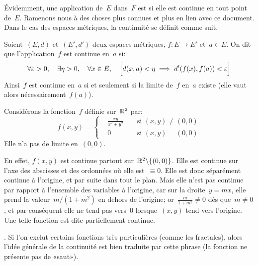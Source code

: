\medskip
Évidemment, une application de~$E$ dans~$F$ est  si elle est continue en tout point de~$E$.
\medskipvm
Ramenons nous à des choses plus connues et plus en lien avec ce document.
Dans le cas des espaces métriques, la continuité se définit comme suit.

\begin{definition}
Soient~$(E,d)$ et~$(E',d')$ deux espaces métriques, $f: E \to E'$ et~$a \in E$.
On dit que l'application~$f$ est continue en~$a$ si:
\begin{equation}
  \forall \varepsilon > 0, \quad \exists \eta > 0, \quad \forall x \in E, \quad \Bigl[d(x,a)<\eta \implies d'(f(x),f(a))<\varepsilon\Bigr]
\end{equation}
Ainsi~$f$ est continue en~$a$ si et seulement si la limite de~$f$ en~$a$ existe (elle vaut alors nécessairement~$f(a)$).
\end{definition}

\medskip
Considérons la fonction~$f$ définie sur~$\mathbb R^2$ par:
\begin{equation}
  f(x,y)=\left\{\begin{aligned}&\frac{xy}{x^2+y^2}&&\text{ si } (x,y)\neq(0,0) \\
&0&&\text{ si } (x,y)=(0,0) \end{aligned}\right.
\end{equation}
Elle n'a pas de limite en~$(0,0)$.

\small
En effet, $f(x,y)$ est continue partout sur~$\mathbb R^2\backslash\{(0,0)\}$. Elle est continue sur l'axe des abscisses et des ordonnées où elle est~$\equiv0$. Elle est donc séparément continue à l'origine, et par suite dans tout le plan. Mais elle n'est pas continue par rapport à l'ensemble des variables à l'origine, car sur la droite~$y=mx$, elle prend la valeur~$m/(1+m^2)$ en dehors de l'origine; or~$\frac{m}{1+m^2}\ne0$ dès que~$m\ne0$, et par conséquent elle ne tend pas vers~$0$ lorsque~$(x,y)$ tend vers l'origine. Une telle fonction est dite partiellement continue.
\normalsize

\medskip
{}. Si l'on exclut certains fonctions très particulières (comme les fractales), alors l'idée générale de la continuité est bien traduite par cette phrase (la fonction ne présente pas de «saut»).

